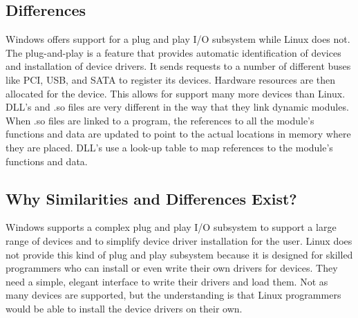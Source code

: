 \documentclass[letterpaper,10pt,titlepage]{article}
\begin{document}
\subsection{Differences}
Windows offers support for a plug and play I/O subsystem while Linux does not.
The plug-and-play is a feature that provides automatic identification of 
devices and installation of device drivers. It sends requests to a number of
different buses like PCI, USB, and SATA to register its devices. Hardware 
resources are then allocated for the device. This allows for support many more
devices than Linux.
\\
\linebreak
DLL's and .so files are very different in the way that they link dynamic 
modules. When .so files are linked to a program, the references to all the 
module's functions and data are updated to point to the actual locations in 
memory where they are placed. DLL's use a look-up table to map references to 
the module's functions and data.
\subsection{Why Similarities and Differences Exist?}
Windows supports a complex plug and play I/O subsystem to support a large 
range of devices and to simplify device driver installation for the user. 
Linux does not provide this kind of plug and play subsystem because it is 
designed for skilled programmers who can install or even write their own 
drivers for devices. They need a simple, elegant interface to write their 
drivers and load them. Not as many devices are supported, but the understanding
is that Linux programmers would be able to install the device drivers on their
own.
%
\nocite{*}
\RaggedRight


\end{document}
